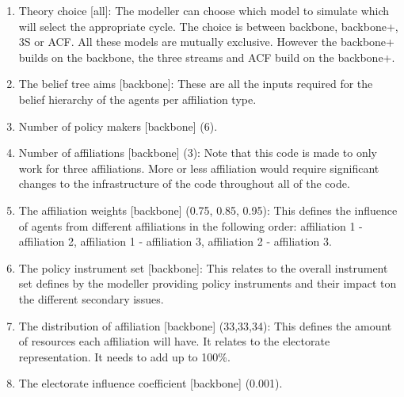 \begin{enumerate}
\item Theory choice [all]: The modeller can choose which model to simulate which will select the appropriate cycle. The choice is between backbone, backbone+, 3S or ACF. All these models are mutually exclusive. However the backbone+ builds on the backbone, the three streams and ACF build on the backbone+.

\item The belief tree aims [backbone]: These are all the inputs required for the belief hierarchy of the agents per affiliation type.
\item Number of policy makers [backbone] (6).
\item Number of affiliations [backbone] (3): Note that this code is made to only work for three affiliations. More or less affiliation would require significant changes to the infrastructure of the code throughout all of the code.
\item The affiliation weights [backbone] (0.75, 0.85, 0.95): This defines the influence of agents from different affiliations in the following order: affiliation 1 - affiliation 2, affiliation 1 - affiliation 3, affiliation  2 - affiliation 3.
\item The policy instrument set [backbone]: This relates to the overall instrument set defines by the modeller providing policy instruments and their impact ton the different secondary issues.
\item The distribution of affiliation [backbone] (33,33,34): This defines the amount of resources each affiliation will have. It relates to the electorate representation. It needs to add up to 100\%.
\item The electorate influence coefficient [backbone] (0.001).


\end{enumerate}
